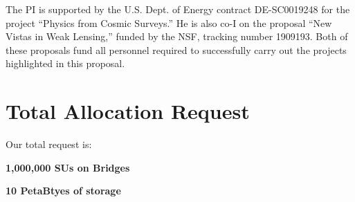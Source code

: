 \documentclass[12pt]{article}
\begin{document}
\begin{small}
The PI is supported by the U.S. Dept. of Energy contract DE-SC0019248 for the project ``Physics from Cosmic Surveys.'' He is also co-I on the proposal ``New Vistas in Weak Lensing,'' funded by the NSF, tracking number 1909193. Both of these proposals fund all personnel required to successfully carry out the projects highlighted in this proposal.

\section{Total Allocation Request}

Our total request is:

{\bf 1,000,000 SUs on Bridges}

{\bf 10 PetaBtyes of storage}

\end{small}




\end{document}
